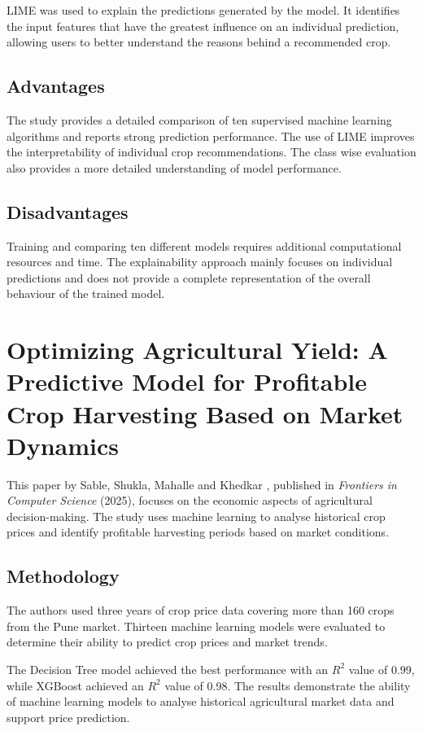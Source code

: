 LIME was used to explain the predictions generated by the model. It identifies the input features that have the greatest influence on an individual prediction, allowing users to better understand the reasons behind a recommended crop.

\subsection{Advantages}

The study provides a detailed comparison of ten supervised machine learning algorithms and reports strong prediction performance. The use of LIME improves the interpretability of individual crop recommendations. The class wise evaluation also provides a more detailed understanding of model performance.

\subsection{Disadvantages}

Training and comparing ten different models requires additional computational resources and time. The explainability approach mainly focuses on individual predictions and does not provide a complete representation of the overall behaviour of the trained model.

\section{Optimizing Agricultural Yield: A Predictive Model for Profitable Crop Harvesting Based on Market Dynamics}

This paper by Sable, Shukla, Mahalle and Khedkar , published in \emph{Frontiers in Computer Science} (2025), focuses on the economic aspects of agricultural decision-making. The study uses machine learning to analyse historical crop prices and identify profitable harvesting periods based on market conditions.

\subsection{Methodology}

The authors used three years of crop price data covering more than 160 crops from the Pune market. Thirteen machine learning models were evaluated to determine their ability to predict crop prices and market trends.

The Decision Tree model achieved the best performance with an $R^2$ value of 0.99, while XGBoost achieved an $R^2$ value of 0.98. The results demonstrate the ability of machine learning models to analyse historical agricultural market data and support price prediction.

